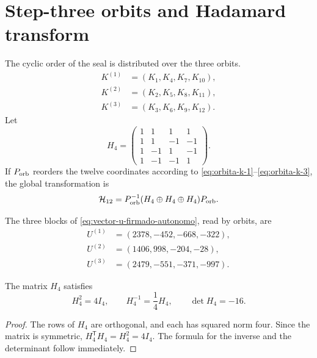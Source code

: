 \section{Step-three orbits and Hadamard transform}

The cyclic order of the seal is distributed over the three orbits.
\begin{align}
 K^{(1)}&=(K_1,K_4,K_7,K_{10}),
 \label{eq:orbita-k-1}\\
 K^{(2)}&=(K_2,K_5,K_8,K_{11}),
 \label{eq:orbita-k-2}\\
 K^{(3)}&=(K_3,K_6,K_9,K_{12}).
 \label{eq:orbita-k-3}
\end{align}
Let
\begin{equation}
 H_4=
 \begin{pmatrix}
 1&1&1&1\\
 1&1&-1&-1\\
 1&-1&1&-1\\
 1&-1&-1&1
 \end{pmatrix}.
 \label{eq:matriz-hadamard-cuatro-autonoma}
\end{equation}
If \(P_{\rm orb}\) reorders the twelve coordinates according to
\eqref{eq:orbita-k-1}--\eqref{eq:orbita-k-3}, the global transformation is
\begin{equation}
 \mathcal H_{12}
 =P_{\rm orb}^{-1}
 (H_4\oplus H_4\oplus H_4)P_{\rm orb}.
 \label{eq:hadamard-global-doce}
\end{equation}

The three blocks of \eqref{eq:vector-u-firmado-autonomo}, read by
orbits, are
\begin{align*}
 U^{(1)}&=(2378,-452,-668,-322),\\
 U^{(2)}&=(1406,998,-204,-28),\\
 U^{(3)}&=(2479,-551,-371,-997).
\end{align*}

\begin{lemma}
\label{lem:cuarto-inversa-hadamard}
The matrix \(H_4\) satisfies
\begin{equation}
 H_4^2=4I_4,
 \qquad
 H_4^{-1}=\frac14H_4,
 \qquad
 \det H_4=-16.
 \label{eq:identidades-hadamard-cuatro}
\end{equation}
\end{lemma}

\begin{proof}
The rows of \(H_4\) are orthogonal, and each has squared norm four.
Since the matrix is symmetric, \(H_4^{\mathsf T}H_4=H_4^2=4I_4\). The
formula for the inverse and the determinant follow immediately.
\end{proof}


